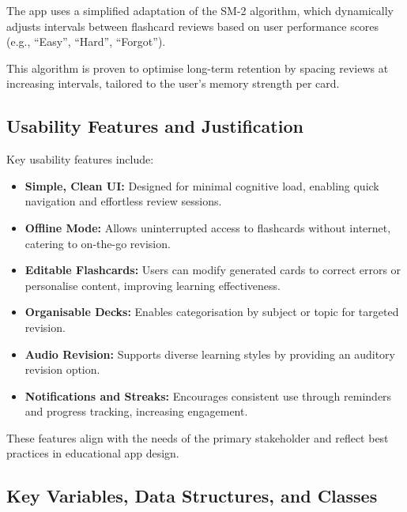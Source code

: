 \documentclass[a4paper,12pt]{article}
\begin{document}
The app uses a simplified adaptation of the SM-2 algorithm, which dynamically adjusts intervals between flashcard reviews based on user performance scores (e.g., “Easy”, “Hard”, “Forgot”).

This algorithm is proven to optimise long-term retention by spacing reviews at increasing intervals, tailored to the user’s memory strength per card.

\subsection{Usability Features and Justification}

Key usability features include:

\begin{itemize}
  \item \textbf{Simple, Clean UI:} Designed for minimal cognitive load, enabling quick navigation and effortless review sessions.
  \item \textbf{Offline Mode:} Allows uninterrupted access to flashcards without internet, catering to on-the-go revision.
  \item \textbf{Editable Flashcards:} Users can modify generated cards to correct errors or personalise content, improving learning effectiveness.
  \item \textbf{Organisable Decks:} Enables categorisation by subject or topic for targeted revision.
  \item \textbf{Audio Revision:} Supports diverse learning styles by providing an auditory revision option.
  \item \textbf{Notifications and Streaks:} Encourages consistent use through reminders and progress tracking, increasing engagement.
\end{itemize}

These features align with the needs of the primary stakeholder and reflect best practices in educational app design.

\newpage

\subsection{Key Variables, Data Structures, and Classes}
\end{document}
